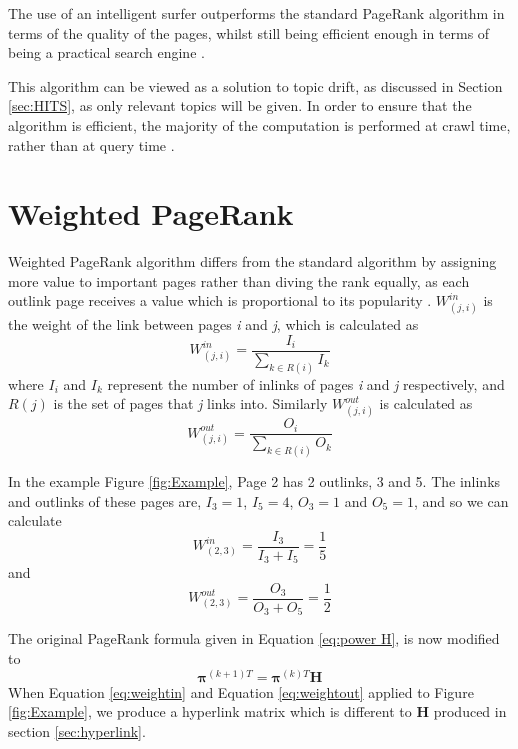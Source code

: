 \documentclass[11pt]{report}
\begin{document}
{The use of an intelligent surfer outperforms the standard PageRank algorithm in terms of the quality of the pages, whilst still being efficient enough in terms of being a practical search engine \cite{richardson2002intelligent}. 

This algorithm can be viewed as a solution to topic drift, as discussed in Section \ref{sec:HITS}, as only relevant topics will be  given. In order to ensure that the algorithm is efficient, the majority of the computation is performed at crawl time, rather than at query time \cite{richardson2002intelligent}. 

\section{Weighted PageRank}\label{sec:weighted}
Weighted PageRank algorithm differs from the standard algorithm by assigning more value to important pages rather than diving the rank equally, as each outlink page receives a value which is proportional to its popularity \cite{xing2004weighted}. $W^{in}_{(j,i)}$ is the weight of the link between pages \textit{i} and \textit{j}, which is calculated as 
\begin{equation}\label{eq:weightin}
W^{in}_{(j,i)} = \frac{I_i}{\sum_{k\in R(i)}I_k}
\end{equation}
where $I_i$ and $I_k$ represent the number of inlinks of pages \textit{i} and \textit{j} respectively, and $R(j)$ is the set of pages that \textit{j} links into. 
Similarly $W^{out}_{(j,i)}$ is calculated as
\begin{equation}\label{eq:weightout}
W^{out}_{(j,i)} = \frac{O_i}{\sum_{k\in R(i)}O_k}
\end{equation}

In the example Figure \ref{fig:Example}, Page 2 has 2 outlinks, 3 and 5. The inlinks and outlinks of these pages are, $I_3 = 1$, $I_5 = 4$, $O_3 = 1$ and $O_5 = 1$, and so we can calculate 
\[W^{in}_{(2,3)} = \frac{I_3}{I_3 + I_5} = \frac{1}{5} \]
and 
\[W^{out}_{(2,3)} = \frac{O_3}{O_3 + O_5} = \frac{1}{2} \] 

The original PageRank formula given in Equation \eqref{eq:power H}, is now modified to 
\begin{equation} \label{eq:WPR formula}
\boldsymbol\pi^{(k+1)T} = \boldsymbol\pi^{(k)T}\textbf{H}
\end{equation}
When Equation \eqref{eq:weightin} and Equation \eqref{eq:weightout} applied to Figure \ref{fig:Example}, we produce a hyperlink matrix which is different to \textbf{H} produced in section \ref{sec:hyperlink}. 

}
\end{document}
